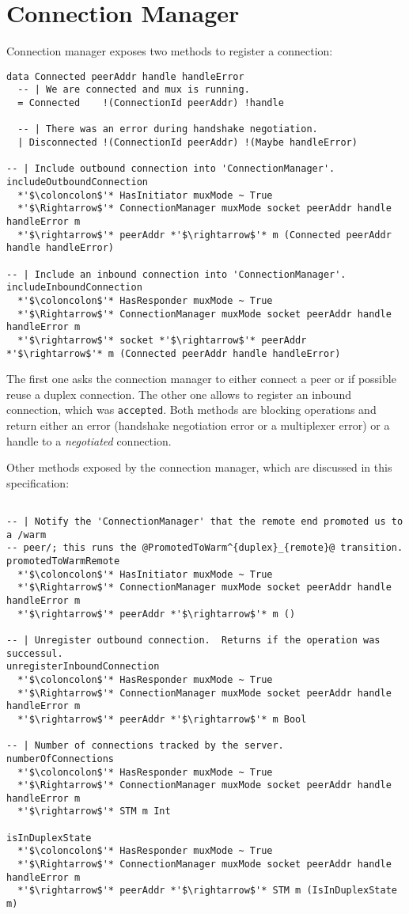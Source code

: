 \documentclass{article}
\begin{document}
\section{Connection Manager}

Connection manager exposes two methods to register a connection:
\begin{lstlisting}
data Connected peerAddr handle handleError
  -- | We are connected and mux is running.
  = Connected    !(ConnectionId peerAddr) !handle

  -- | There was an error during handshake negotiation.
  | Disconnected !(ConnectionId peerAddr) !(Maybe handleError)

-- | Include outbound connection into 'ConnectionManager'.
includeOutboundConnection
  *'$\coloncolon$'* HasInitiator muxMode ~ True
  *'$\Rightarrow$'* ConnectionManager muxMode socket peerAddr handle handleError m
  *'$\rightarrow$'* peerAddr *'$\rightarrow$'* m (Connected peerAddr handle handleError)

-- | Include an inbound connection into 'ConnectionManager'.
includeInboundConnection
  *'$\coloncolon$'* HasResponder muxMode ~ True
  *'$\Rightarrow$'* ConnectionManager muxMode socket peerAddr handle handleError m
  *'$\rightarrow$'* socket *'$\rightarrow$'* peerAddr *'$\rightarrow$'* m (Connected peerAddr handle handleError)
\end{lstlisting}
The first one asks the connection manager to either connect a peer or if
possible reuse a duplex connection.  The other one allows to register an
inbound connection, which was \texttt{accepted}.  Both methods are blocking
operations and return either an error (handshake negotiation error or
a multiplexer error) or a handle to a \textit{negotiated} connection.

Other methods exposed by the connection manager, which are discussed in this
specification:
\begin{lstlisting}

-- | Notify the 'ConnectionManager' that the remote end promoted us to a /warm
-- peer/; this runs the @PromotedToWarm^{duplex}_{remote}@ transition.
promotedToWarmRemote
  *'$\coloncolon$'* HasInitiator muxMode ~ True
  *'$\Rightarrow$'* ConnectionManager muxMode socket peerAddr handle handleError m
  *'$\rightarrow$'* peerAddr *'$\rightarrow$'* m ()

-- | Unregister outbound connection.  Returns if the operation was successul.
unregisterInboundConnection
  *'$\coloncolon$'* HasResponder muxMode ~ True
  *'$\Rightarrow$'* ConnectionManager muxMode socket peerAddr handle handleError m
  *'$\rightarrow$'* peerAddr *'$\rightarrow$'* m Bool

-- | Number of connections tracked by the server.
numberOfConnections
  *'$\coloncolon$'* HasResponder muxMode ~ True
  *'$\Rightarrow$'* ConnectionManager muxMode socket peerAddr handle handleError m
  *'$\rightarrow$'* STM m Int

isInDuplexState 
  *'$\coloncolon$'* HasResponder muxMode ~ True
  *'$\Rightarrow$'* ConnectionManager muxMode socket peerAddr handle handleError m
  *'$\rightarrow$'* peerAddr *'$\rightarrow$'* STM m (IsInDuplexState m)
\end{lstlisting}
\end{document}
